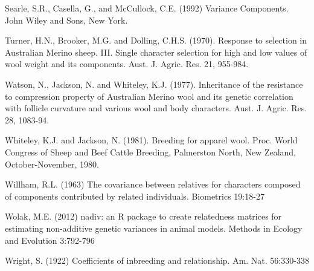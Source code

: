 \documentclass[titlepage]{article}  %
\begin{document}
\begin{thebibliography}{99}
Searle, S.R., Casella, G., and McCullock, C.E. (1992) Variance Components.
    John Wiley and Sons, New York.

Turner, H.N., Brooker, M.G. and Dolling, C.H.S. (1970).  Response to
    selection in Australian Merino sheep. III.  Single character selection
    for high and low values of wool weight and its components.  Aust. J.
    Agric. Res. 21, 955-984.

Watson, N., Jackson, N. and Whiteley, K.J. (1977).  Inheritance of the
    resistance to compression property of Australian Merino wool and its
    genetic correlation with follicle curvature and various wool and body
    characters.  Aust. J. Agric. Res. 28, 1083-94.

Whiteley, K.J. and Jackson, N. (1981).  Breeding for apparel wool.  Proc.
    World Congress of Sheep and Beef Cattle Breeding, Palmerston North, New
    Zealand, October-November, 1980.

Willham, R.L. (1963) The covariance between relatives for characters composed
    of components contributed by related individuals. Biometrics 19:18-27

Wolak, M.E. (2012) nadiv: an R package to create relatedness matrices for
    estimating non-additive genetic variances in animal models. 
    Methods in Ecology and Evolution 3:792-796

Wright, S. (1922) Coefficients of inbreeding and relationship. 
    Am. Nat. 56:330-338

\end{thebibliography}
\end{document}
